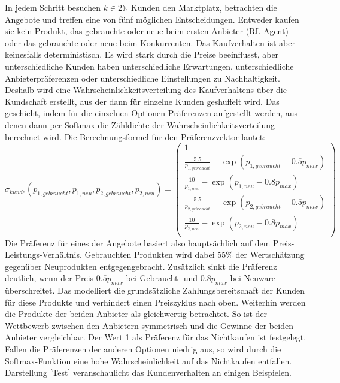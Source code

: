 In jedem Schritt besuchen $k \in 2\mathbb{N}$ Kunden den Marktplatz, betrachten die Angebote und treffen eine von fünf möglichen Entscheidungen.
Entweder kaufen sie kein Produkt, das gebrauchte oder neue beim ersten Anbieter (RL-Agent) oder das gebrauchte oder neue beim Konkurrenten.
Das Kaufverhalten ist aber keinesfalls deterministisch.
Es wird stark durch die Preise beeinflusst, aber unterschiedliche Kunden haben unterschiedliche Erwartungen, unterschiedliche Anbieterpräferenzen oder unterschiedliche Einstellungen zu Nachhaltigkeit.
Deshalb wird eine Wahrscheinlichkeitsverteilung des Kaufverhaltens über die Kundschaft erstellt, aus der dann für einzelne Kunden geshuffelt wird.
Das geschieht, indem für die einzelnen Optionen Präferenzen aufgestellt werden, aus denen dann per Softmax die Zähldichte der Wahrscheinlichkeitsverteilung berechnet wird.
Die Berechnungsformel für den Präferenzvektor lautet:
\begin{equation}
	\sigma_{kunde}(p_{1, gebraucht}, p_{1, neu}, p_{2, gebraucht}, p_{2, neu}) =
	\begin{pmatrix}
		1\\
		\frac{5.5}{p_{1, gebraucht}} - \exp{(p_{1, gebraucht} - 0.5 p_{max})}\\
		\frac{10}{p_{1, neu}} - \exp{(p_{1, neu} - 0.8 p_{max})}\\
		\frac{5.5}{p_{2, gebraucht}} - \exp{(p_{2, gebraucht} - 0.5 p_{max})}\\
		\frac{10}{p_{2, neu}} - \exp{(p_{2, neu} - 0.8 p_{max})}\\
	\end{pmatrix}
\end{equation}
Die Präferenz für eines der Angebote basiert also hauptsächlich auf dem Preis-Leistungs-Verhältnis.
Gebrauchten Produkten wird dabei 55\% der Wertschätzung gegenüber Neuprodukten entgegengebracht.
Zusätzlich sinkt die Präferenz deutlich, wenn der Preis $0.5 p_{max}$ bei Gebraucht- und $0.8 p_{max}$ bei Neuware überschreitet.
Das modelliert die grundsätzliche Zahlungsbereitschaft der Kunden für diese Produkte und verhindert einen Preiszyklus nach oben.
Weiterhin werden die Produkte der beiden Anbieter als gleichwertig betrachtet.
So ist der Wettbewerb zwischen den Anbietern symmetrisch und die Gewinne der beiden Anbieter vergleichbar.
Der Wert 1 als Präferenz für das Nichtkaufen ist festgelegt.
Fallen die Präferenzen der anderen Optionen niedrig aus, so wird durch die Softmax-Funktion eine hohe Wahrscheinlichkeit auf das Nichtkaufen entfallen.
Darstellung [Test] veranschaulicht das Kundenverhalten an einigen Beispielen.

